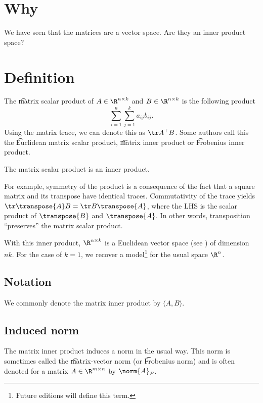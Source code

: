 
\section*{Why}

We have seen that the matrices are a vector space.
Are they an inner product space?

\section*{Definition}

The \t{matrix scalar product} of $A \in \R ^{n \times k}$ and $B \in \R ^{n \times k}$ is the following product
\[
\sum_{i = 1}^{n} \sum_{j = 1}^{k} a_{ij}b_{ij}.
\]
Using the matrix trace, we can denote this as $\tr A^\top  B$.
Some authors call this the \t{Euclidean matrix scalar product}, \t{matrix inner product} or \t{Frobenius inner product}.

\begin{proposition}
The matrix scalar product is an inner product.
\end{proposition}


For example, symmetry of the product is a consequence of the fact that a square matrix and its transpose have identical traces.
Commutativity of the trace yields $\tr \transpose{A} B = \tr B\transpose{A}$, where the LHS is the scalar product of $\transpose{B}$ and $\transpose{A}$.
In other words, transposition ``preserves'' the matrix scalar product.

With this inner product, $\R ^{n \times k}$ is a Euclidean vector space (see ) of dimension $nk$.
For the case of $k = 1$, we recover a model\footnote{Future editions will define this term.}
for the usual space $\R ^n$.

\subsection*{Notation}

We commonly denote the matrix inner product by $\langle A, B \rangle$.

\subsection*{Induced norm}

The matrix inner product induces a norm in the usual way.
This norm is sometimes called the \t{matrix-vector norm} (or \t{Frobenius norm}) and is often denoted for a matrix $A \in \R ^{m \times  n}$ by $\norm{A}_F$.
